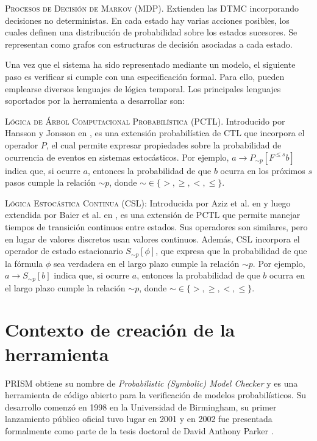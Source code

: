 \documentclass[runningheads]{llncs}
\begin{document}
\vspace{.5em}

\textsc{Procesos de Decisión de Markov (MDP)}. Extienden las DTMC incorporando decisiones no deterministas. En cada estado hay varias acciones posibles, los cuales definen una distribución de probabilidad sobre los estados sucesores. Se representan como grafos con estructuras de decisión asociadas a cada estado.

\vspace{.5em}

Una vez que el sistema ha sido representado mediante un modelo, el siguiente paso es verificar si cumple con una especificación formal. Para ello, pueden emplearse diversos lenguajes de lógica temporal. Los principales lenguajes soportados por la herramienta a desarrollar son:

\vspace{.5em}

\textsc{Lógica de Árbol Computacional Probabilística (PCTL)}. Introducido por Hansson y Jonsson en \cite{HH94}, es una extensión probabilística de CTL que incorpora el operador $P$, el cual permite expresar propiedades sobre la probabilidad de ocurrencia de eventos en sistemas estocásticos. Por ejemplo, $a \to P_{\sim p}[F^{\le s} b]$ indica que, si ocurre $a$, entonces la probabilidad de que $b$ ocurra en los próximos $s$ pasos cumple la relación $\sim p$, donde $\sim\in\{>,\ge,<,\le\}$.

\vspace{.5em}

\textsc{Lógica Estocástica Continua (CSL)}: Introducida por Aziz et al. en \cite{ASSB96} y luego extendida por Baier et al. en \cite{BKH99}, es una extensión de PCTL que permite manejar tiempos de transición continuos entre estados. Sus operadores son similares, pero en lugar de valores discretos usan valores continuos. Además, CSL incorpora el operador de estado estacionario $S_{\sim p}[\phi]$, que expresa que la probabilidad de que la fórmula $\phi$ sea verdadera en el largo plazo cumple la relación $\sim p$. Por ejemplo, $a \to S_{\sim p}[b]$ indica que, si ocurre $a$, entonces la probabilidad de que $b$ ocurra en el largo plazo cumple la relación $\sim p$, donde $\sim\in\{>,\ge,<,\le\}$.

\section{Contexto de creación de la herramienta}
PRISM obtiene su nombre de \textit{Probabilistic (Symbolic) Model Checker} y es una herramienta de código abierto para la verificación de modelos probabilísticos. Su desarrollo comenzó en 1998 en la Universidad de Birmingham, su primer lanzamiento público oficial tuvo lugar en 2001 y en 2002 fue presentada formalmente como parte de la tesis doctoral de David Anthony Parker \cite{Par02}.
\end{document}

